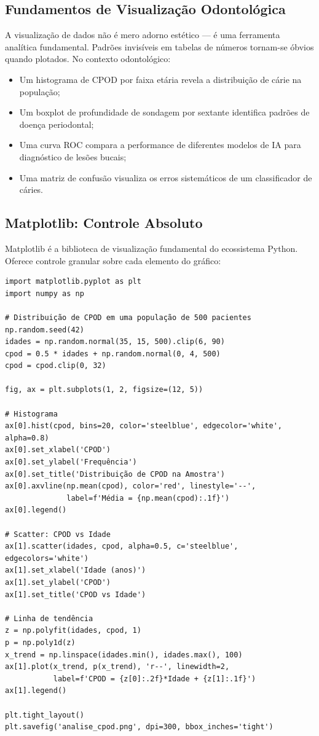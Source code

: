 \subsection{Fundamentos de Visualização Odontológica}

A visualização de dados não é mero adorno estético — é uma ferramenta analítica fundamental. Padrões invisíveis em tabelas de números tornam-se óbvios quando plotados. No contexto odontológico:

\begin{itemize}
    \item Um histograma de CPOD por faixa etária revela a distribuição de cárie na população;
    \item Um boxplot de profundidade de sondagem por sextante identifica padrões de doença periodontal;
    \item Uma curva ROC compara a performance de diferentes modelos de IA para diagnóstico de lesões bucais;
    \item Uma matriz de confusão visualiza os erros sistemáticos de um classificador de cáries.
\end{itemize}

\subsection{Matplotlib: Controle Absoluto}

Matplotlib  é a biblioteca de visualização fundamental do ecossistema Python. Oferece controle granular sobre cada elemento do gráfico:

\begin{verbatim}
import matplotlib.pyplot as plt
import numpy as np

# Distribuição de CPOD em uma população de 500 pacientes
np.random.seed(42)
idades = np.random.normal(35, 15, 500).clip(6, 90)
cpod = 0.5 * idades + np.random.normal(0, 4, 500)
cpod = cpod.clip(0, 32)

fig, ax = plt.subplots(1, 2, figsize=(12, 5))

# Histograma
ax[0].hist(cpod, bins=20, color='steelblue', edgecolor='white', alpha=0.8)
ax[0].set_xlabel('CPOD')
ax[0].set_ylabel('Frequência')
ax[0].set_title('Distribuição de CPOD na Amostra')
ax[0].axvline(np.mean(cpod), color='red', linestyle='--',
              label=f'Média = {np.mean(cpod):.1f}')
ax[0].legend()

# Scatter: CPOD vs Idade
ax[1].scatter(idades, cpod, alpha=0.5, c='steelblue', edgecolors='white')
ax[1].set_xlabel('Idade (anos)')
ax[1].set_ylabel('CPOD')
ax[1].set_title('CPOD vs Idade')

# Linha de tendência
z = np.polyfit(idades, cpod, 1)
p = np.poly1d(z)
x_trend = np.linspace(idades.min(), idades.max(), 100)
ax[1].plot(x_trend, p(x_trend), 'r--', linewidth=2,
           label=f'CPOD = {z[0]:.2f}*Idade + {z[1]:.1f}')
ax[1].legend()

plt.tight_layout()
plt.savefig('analise_cpod.png', dpi=300, bbox_inches='tight')
\end{verbatim}

